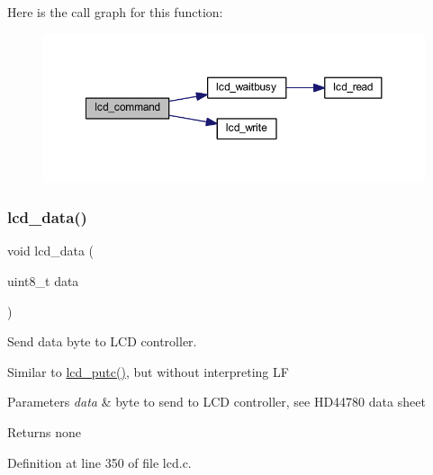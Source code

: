 Here is the call graph for this function\+:\nopagebreak
\begin{figure}[H]
\begin{center}
\leavevmode
\includegraphics[width=350pt]{group__pfleury__lcd_gaea9d14f02df06f948cb5a56776980826_cgraph}
\end{center}
\end{figure}
\mbox{\label{group__pfleury__lcd_gad0729d2cba627825a089ca1fff12ba29}} 
\subsubsection{\texorpdfstring{lcd\_data()}{lcd\_data()}}
{\footnotesize\ttfamily void lcd\+\_\+data (\begin{DoxyParamCaption}\item[{uint8\+\_\+t}]{data }\end{DoxyParamCaption})}



Send data byte to L\+CD controller. 

Similar to \mbox{\hyperlink{group__pfleury__lcd_gafa7e36b95c43d603f510273ad077cbbe}{lcd\+\_\+putc()}}, but without interpreting LF 
\begin{DoxyParams}{Parameters}
{\em data} & byte to send to L\+CD controller, see H\+D44780 data sheet \\
\hline
\end{DoxyParams}
\begin{DoxyReturn}{Returns}
none 
\end{DoxyReturn}


Definition at line 350 of file lcd.\+c.

